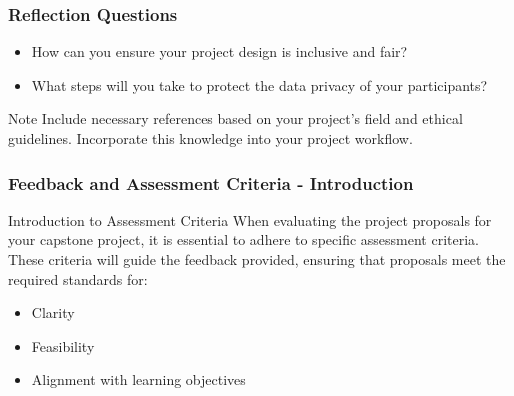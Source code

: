 \documentclass[aspectratio=169]{beamer}
\begin{document}
\begin{frame}[fragile]
    \frametitle{Reflection Questions}
    \begin{itemize}
        \item How can you ensure your project design is inclusive and fair?
        \item What steps will you take to protect the data privacy of your participants?
    \end{itemize}
    
    \begin{block}{Note}
        Include necessary references based on your project's field and ethical guidelines. Incorporate this knowledge into your project workflow.
    \end{block}
\end{frame}

\begin{frame}[fragile]
    \frametitle{Feedback and Assessment Criteria - Introduction}
    \begin{block}{Introduction to Assessment Criteria}
        When evaluating the project proposals for your capstone project, it is essential to adhere to specific assessment criteria. 
        These criteria will guide the feedback provided, ensuring that proposals meet the required standards for:
        \begin{itemize}
            \item Clarity
            \item Feasibility
            \item Alignment with learning objectives
        \end{itemize}
    \end{block}
\end{frame}
\end{document}
